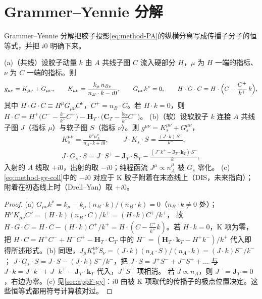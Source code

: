 \section{Grammer--Yennie 分解}\label{sec:method-gy}

Grammer--Yennie 分解把胶子投影\cref{eq:method-PA}的纵横分离写成传播子分子的恒等式，并把 $i0$ 明确下来。


\begin{lemma}\label{lem:method-gy}
(a)（共线）设胶子动量 $k$ 由 $A$ 共线子图 $C$ 流入硬部分 $H$，$\mu$ 为 $H$ 一端的指标、$\nu$ 为 $C$ 一端的指标。则
\begin{equation}\label{eq:method-gy-coll}
g_{\mu\nu}=K_{\mu\nu}+G_{\mu\nu},\qquad K_{\mu\nu}=\frac{k_\mu\,n_{B\nu}}{n_B\cdot k-i0},\qquad G_{\mu\nu}k^\nu=0,\qquad
H\cdot G\cdot C=H\cdot\Bigl(C-\frac{C^+}{k^+}\,k\Bigr) ,
\end{equation}
其中 $H\cdot G\cdot C\equiv H^\mu G_{\mu\nu}C^\nu$，$C^+=n_B\cdot C$。若 $H\cdot k=0$，则
$H\cdot C=H^+\bigl(C^--\frac{k^-}{k^+}C^+\bigr)-\mathbf H_T\cdot\bigl(\mathbf C_T-\frac{\mathbf k_T}{k^+}C^+\bigr)$。
(b)（软）设软胶子 $k$ 连接 $A$ 共线子图 $J$（指标 $\mu$）与软子图 $S$（指标 $\nu$）。则 $g^{\mu\nu}=K_s^{\mu\nu}+G_s^{\mu\nu}$，
\begin{equation}\label{eq:method-gy-soft}
\begin{gathered}
K_s^{\mu\nu}=\frac{k^\mu n_A^\nu}{n_A\cdot k\pm i0},\qquad J\cdot K_s\cdot S=\frac{(J\cdot k)\,S^-}{k^-},\\
J\cdot G_s\cdot S=J^-S^+-\mathbf J_T\cdot\mathbf S_T-\frac{(J^-k^+-\mathbf J_T\cdot\mathbf k_T)\,S^-}{k^-} ,
\end{gathered}
\end{equation}
入射的 $A$ 线取 $+i0$，出射的取 $-i0$；纯程函流 $J^\mu\propto n_A^\mu$ 被 $G_s$ 零化。
(c) \cref{eq:method-gy-coll}中的 $-i0$ 对应于 K 胶子附着在末态线上（DIS，未来指向）；附着在初态线上时（Drell--Yan）取 $+i0$。
\end{lemma}

\begin{proof}
(a) $G_{\mu\nu}k^\nu=k_\mu-k_\mu(n_B\cdot k)/(n_B\cdot k)=0$（$n_B\cdot k\neq0$ 处）；$H^\mu K_{\mu\nu}C^\nu=(H\cdot k)(n_B\cdot C)/k^+=(H\cdot k)C^+/k^+$，
故 $H\cdot G\cdot C=H\cdot C-(H\cdot k)C^+/k^+=H\cdot(C-\frac{C^+}{k^+}k)$。若 $H\cdot k=0$，K 项为零，把 $H\cdot C=H^+C^-+H^-C^+-\mathbf H_T\cdot\mathbf C_T$ 中的
$H^-=(\mathbf H_T\cdot\mathbf k_T-H^+k^-)/k^+$ 代入即得所述形式。(b) 同理，$J_\mu K_s^{\mu\nu}S_\nu=(J\cdot k)(n_A\cdot S)/(n_A\cdot k)=(J\cdot k)S^-/k^-$；
$J\cdot G_s\cdot S=J\cdot S-(J\cdot k)S^-/k^-$，把 $J\cdot S=J^+S^-+J^-S^++\ldots$ 与 $J\cdot k=J^+k^-+J^-k^+-\mathbf J_T\cdot\mathbf k_T$ 代入，$J^+S^-$ 项相消。
若 $J\propto n_A$，则 $J^-=\mathbf J_T=0$，右边为零。(c) 见\cref{sec:appF-gy}：$i0$ 由被 K 项取代的传播子的极点位置决定。这些恒等式都用符号计算核对过。%
\end{proof}

